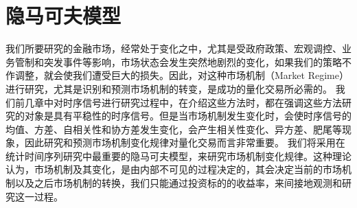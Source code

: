 \documentclass{article}
\begin{document}
\section{隐马可夫模型}
我们所要研究的金融市场，经常处于变化之中，尤其是受政府政策、宏观调控、业务管制和突发事件等影响，市场状态会发生突然地剧烈的变化，如果我们的策略不作调整，就会使我们遭受巨大的损失。因此，对这种市场机制（Market Regime）进行研究，尤其是识别和预测市场机制的转变，是成功的量化交易所必需的。\newline
我们前几章中对时序信号进行研究过程中，在介绍这些方法时，都在强调这些方法研究的对象是具有平稳性的时序信号。但是当市场机制发生变化时，会使时序信号的均值、方差、自相关性和协方差发生变化，会产生相关性变化、异方差、肥尾等现象，因此研究和预测市场机制变化规律对量化交易而言非常重要。\newline
我们将采用在统计时间序列研究中最重要的隐马可夫模型，来研究市场机制变化规律。这种理论认为，市场机制及其变化，是由内部不可见的过程决定的，其会决定当前的市场机制以及之后市场机制的转换，我们只能通过投资标的的收益率，来间接地观测和研究这一过程。
\end{document}
